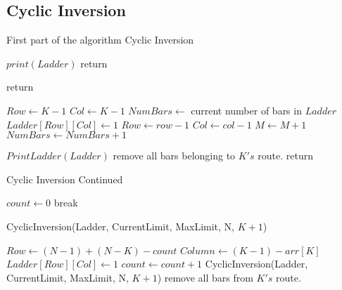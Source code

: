 \subsection{Cyclic Inversion}
\begin{algorithm}
  \caption{First part of the algorithm Cyclic Inversion}
  \begin{algorithmic}[1]


      
        \State $print(Ladder)$
        \State return
      \EndIf

        \State return
      \EndIf


      \State $Row \gets K-1$
      \State $Col \gets K-1$
      \State $NumBars \gets$ current number of bars in $Ladder$
        \State $Ladder[Row][Col] \gets 1$
        \State $Row \gets row-1$
        \State $Col \gets col-1$
        \State $M \gets M+1$
        \State $NumBars \gets NumBars+1$
      \EndWhile

        \State $PrintLadder(Ladder)$
      \EndIf
      \State remove all bars belonging to $K's$ route.
      \State return
    \EndIf


  \end{algorithmic}
\end{algorithm}

\begin{algorithm}
  \caption{Cyclic Inversion Continued}
    \begin{algorithmic}[1]

      \State $count \gets 0$
            \State break
        \EndIf

          \State CyclicInversion(Ladder, CurrentLimit, MaxLimit, N, $K+1$)
      
       
        
        \Else
          \State $Row \gets (N-1) + (N-K) - count$
          \State $Column \gets (K-1)-arr[K]$
          \State $Ladder[Row][Col] \gets 1$
          \State $count \gets count + 1$
          \State CyclicInversion(Ladder, CurrentLimit, MaxLimit, N, $K+1$)
        \EndIf
      \EndFor
      \State remove all bars from $K's$ route.

    \EndIf
    \EndFunction
  \end{algorithmic}
\end{algorithm}


